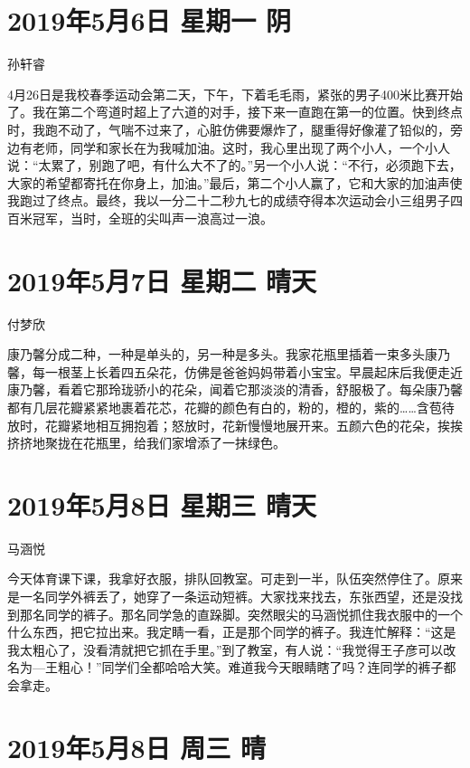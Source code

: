 \section{2019年5月6日 星期一 阴}

孙轩睿

4月26日是我校春季运动会第二天，下午，下着毛毛雨，紧张的男子400米比赛开始了。我在第二个弯道时超上了六道的对手，接下来一直跑在第一的位置。快到终点时，我跑不动了，气喘不过来了，心脏仿佛要爆炸了，腿重得好像灌了铅似的，旁边有老师，同学和家长在为我喊加油。这时，我心里出现了两个小人，一个小人说：``太累了，别跑了吧，有什么大不了的。''另一个小人说：``不行，必须跑下去，大家的希望都寄托在你身上，加油。''最后，第二个小人赢了，它和大家的加油声使我跑过了终点。最终，我以一分二十二秒九七的成绩夺得本次运动会小三组男子四百米冠军，当时，全班的尖叫声一浪高过一浪。

\section{2019年5月7日 星期二 晴天}

付梦欣

康乃馨分成二种，一种是单头的，另一种是多头。我家花瓶里插着一束多头康乃馨，每一根茎上长着四五朵花，仿佛是爸爸妈妈带着小宝宝。早晨起床后我便走近康乃馨，看着它那玲珑骄小的花朵，闻着它那淡淡的清香，舒服极了。每朵康乃馨都有几层花瓣紧紧地裹着花芯，花瓣的颜色有白的，粉的，橙的，紫的\ldots\ldots 含苞待放时，花瓣紧地相互拥抱着；怒放时，花新慢慢地展开来。五颜六色的花朵，挨挨挤挤地聚拢在花瓶里，给我们家增添了一抹绿色。

\section{2019年5月8日 星期三 晴天}

马涵悦

今天体育课下课，我拿好衣服，排队回教室。可走到一半，队伍突然停住了。原来是一名同学外裤丢了，她穿了一条运动短裤。大家找来找去，东张西望，还是没找到那名同学的裤子。那名同学急的直跺脚。突然眼尖的马涵悦抓住我衣服中的一个什么东西，把它拉出来。我定睛一看，正是那个同学的裤子。我连忙解释：``这是我太粗心了，没看清就把它抓在手里。''到了教室，有人说：``我觉得王子彦可以改名为---王粗心！''同学们全都哈哈大笑。难道我今天眼睛瞎了吗？连同学的裤子都会拿走。

\section{2019年5月8日 周三 晴}

